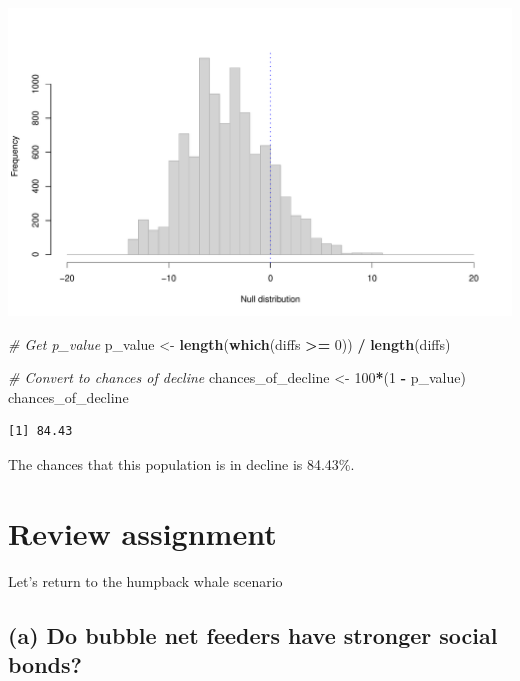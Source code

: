 \documentclass[
]{book}
\newenvironment{Shaded}{\begin{snugshade}}{\end{snugshade}}
\newcommand{\CommentTok}[1]{\textcolor[rgb]{0.56,0.35,0.01}{\textit{#1}}}
\newcommand{\DecValTok}[1]{\textcolor[rgb]{0.00,0.00,0.81}{#1}}
\newcommand{\KeywordTok}[1]{\textcolor[rgb]{0.13,0.29,0.53}{\textbf{#1}}}
\newcommand{\NormalTok}[1]{#1}
\newcommand{\OperatorTok}[1]{\textcolor[rgb]{0.81,0.36,0.00}{\textbf{#1}}}
\newcommand{\StringTok}[1]{\textcolor[rgb]{0.31,0.60,0.02}{#1}}
\begin{document}
\includegraphics{figures/unnamed-chunk-309-1.pdf}

\begin{Shaded}
\begin{Highlighting}[]
\CommentTok{# Get p_value}
\NormalTok{p_value <-}\StringTok{ }\KeywordTok{length}\NormalTok{(}\KeywordTok{which}\NormalTok{(diffs }\OperatorTok{>=}\StringTok{ }\DecValTok{0}\NormalTok{)) }\OperatorTok{/}\StringTok{ }\KeywordTok{length}\NormalTok{(diffs)}

\CommentTok{# Convert to chances of decline}
\NormalTok{chances_of_decline <-}\StringTok{ }\DecValTok{100}\OperatorTok{*}\NormalTok{(}\DecValTok{1} \OperatorTok{-}\StringTok{ }\NormalTok{p_value)}
\NormalTok{chances_of_decline}
\end{Highlighting}
\end{Shaded}

\begin{verbatim}
[1] 84.43
\end{verbatim}

The chances that this population is in decline is 84.43\%.

\hypertarget{review-assignment-11}{%
\section*{Review assignment}\label{review-assignment-11}}

Let's return to the humpback whale scenario

\hypertarget{a-do-bubble-net-feeders-have-stronger-social-bonds}{%
\subsection*{(a) Do bubble net feeders have stronger social bonds?}\label{a-do-bubble-net-feeders-have-stronger-social-bonds}}
\end{document}
